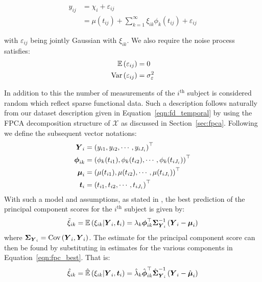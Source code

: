 \begin{align}
	y_{ij} &= \chi_{i} + \varepsilon_{ij} \\
	&= \mu(t_{ij}) + \sum_{k=1}^{\infty} \xi_{ik} \phi_k(t_{ij}) + \varepsilon_{ij} \label{eqn:fd_temporal_fpca}
\end{align}

with $\varepsilon_{ij}$ being jointly Gaussian with $\xi_{ik}$.
We also require the noise process satisfies:
\begin{align}
	\operatorname{\mathbb{E}}\left(\varepsilon_{ij}\right) &= 0 \\
	\text{Var}\left( \varepsilon_{ij} \right) &= \sigma_\varepsilon^2
\end{align}

In addition to this the number of measurements of the $i^\text{th}$ subject is considered random which reflect sparse functional data.
Such a description follows naturally from our dataset description given in Equation~\eqref{eqn:fd_temporal} by using the FPCA decomposition structure of $\mathcal{X}$ as discussed in Section~\ref{sec:fpca}.
Following \citep{yao_functional_2005} we define the subsequent vector notations:
\begin{align}
	\bm{{Y}}_{i} &= \left(y_{i1}, y_{i2}, \cdots, y_{iJ_i}\right)^\top \label{eqn:yvec}\\
	\bm{{\phi}}_{ik} &= \left(\phi_{k}(t_{i1}), \phi_{k}(t_{i2}), \cdots, \phi_k(t_{iJ_i}) \right)^\top \label{eqn:phivec} \\
	\bm{{\mu}}_{i} &= \left(\mu(t_{i1}), \mu(t_{i2}), \cdots, \mu(t_{iJ_i})\right)^\top \label{eqn:muvec}\\
	\bm{{t}}_{i} &= \left( t_{i1}, t_{i2}, \cdots, t_{iJ_i} \right)^\top \label{eqn:tvec}
\end{align}
With such a model and assumptions, as stated in \citep{yao_functional_2005}, the best prediction of the principal component scores for the $i^\text{th}$  subject is given by:
\begin{equation}\label{eqn:fpc_best}
	\tilde{\xi}_{ik} = \operatorname{\mathbb{E}}\left(\xi_{ik} | \bm{{Y}}_{i}, \bm{{t}}_{i} \right) = \lambda_k \bm{{\phi}}_{ik}^{\top} \bm{{\Sigma}}_{\bm{{Y}}_{i}}^{-1} \left( \bm{{Y}}_{i} - \bm{{\mu}}_{i} \right)
\end{equation}
where $\bm{{\Sigma}}_{\bm{{Y}}_{i}} = \text{Cov}\left(\bm{{Y}}_{i}, \bm{{Y}}_{i} \right)$.
The estimate for the principal component score can then be found by substituting in estimates for the various components in Equation~\eqref{eqn:fpc_best}.
That is:
\begin{equation}\label{eqn:fpc_est}
	\hat{\xi}_{ik}= \hat{\operatorname{\mathbb{E}}}\left(\xi_{ik} | \bm{{Y}}_{i}, \bm{{t}}_{i} \right) = \hat\lambda_k \hat{\bm{{\phi}}}_{ik}^{\top} \hat{\bm{{\Sigma}}}_{\bm{{Y}}_{i}}^{-1} \left( \bm{{Y}}_{i} - \hat{\bm{{\mu}}}_{i} \right)
\end{equation}

